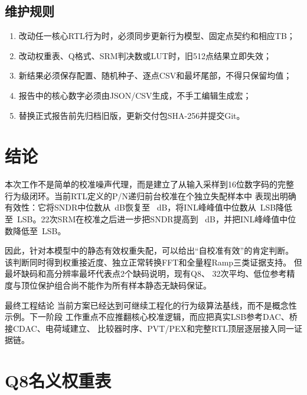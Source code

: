 \documentclass[11pt,a4paper,UTF8,fontset=none,openany]{ctexrep}
\numberwithin{equation}{chapter}
\numberwithin{figure}{chapter}
\numberwithin{table}{chapter}
\begin{document}
\section{维护规则}

\begin{enumerate}
  \item 改动任一核心RTL行为时，必须同步更新行为模型、固定点契约和相应TB；
  \item 改动权重表、Q格式、SRM判决数或LUT时，旧512点结果立即失效；
  \item 新结果必须保存配置、随机种子、逐点CSV和最坏尾部，不得只保留均值；
  \item 报告中的核心数字必须由JSON/CSV生成，不手工编辑生成宏；
  \item 替换正式报告前先归档旧版，更新交付包SHA-256并提交Git。
\end{enumerate}

\chapter{结论}

本次工作不是简单的校准噪声代理，而是建立了从输入采样到16位数字码的完整
行为级闭环。当前RTL定义的P/N递归前台校准在\ChipCount 个独立失配样本中
表现出明确有效性：它将SNDR中位数从\NominalSndrMedian\ dB恢复至
\CalNoSrmSndrMedian\ dB，将INL峰峰值中位数从\NominalInlMedian\ LSB降低
至\CalNoSrmInlMedian\ LSB。22次SRM在校准之后进一步把SNDR提高到
\CalSndrMedian\ dB，并把INL峰峰值中位数降低至\CalInlMedian\ LSB。

因此，针对本模型中的静态有效权重失配，可以给出“自校准有效”的肯定判断。
该判断同时得到权重接近度、独立正常转换FFT和全量程Ramp三类证据支持。
但最坏缺码\CalMissingMax 和高分辨率最坏代表点2个缺码说明，现有Q8、
32次平均、低位参考精度与顶位保护组合尚不能作为所有样本静态无缺码保证。

\begin{evidencebox}{最终工程结论}
当前方案已经达到可继续工程化的行为级算法基线，而不是概念性示例。下一阶段
工作重点不应推翻核心校准逻辑，而应把真实LSB参考DAC、桥接CDAC、电荷域建立、
比较器时序、PVT/PEX和完整RTL顶层逐层接入同一证据链。
\end{evidencebox}

\appendix

\chapter{Q8名义权重表}
\end{document}
